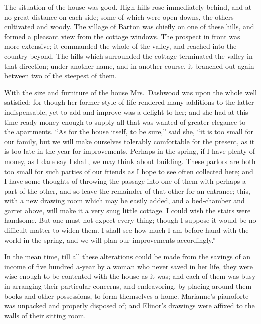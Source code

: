 \documentclass{article}
\begin{document}
The situation of the house was good.  High hills rose
immediately behind, and at no great distance on each side;
some of which were open downs, the others cultivated and woody.
The village of Barton was chiefly on one of these hills,
and formed a pleasant view from the cottage windows.
The prospect in front was more extensive; it commanded the
whole of the valley, and reached into the country beyond.
The hills which surrounded the cottage terminated
the valley in that direction; under another name,
and in another course, it branched out again between two
of the steepest of them.

With the size and furniture of the house Mrs.\ Dashwood
was upon the whole well satisfied; for though her former
style of life rendered many additions to the latter
indispensable, yet to add and improve was a delight to her;
and she had at this time ready money enough to supply all
that was wanted of greater elegance to the apartments.
``As for the house itself, to be sure,'' said she, ``it is
too small for our family, but we will make ourselves
tolerably comfortable for the present, as it is too late
in the year for improvements.  Perhaps in the spring,
if I have plenty of money, as I dare say I shall, we may
think about building.  These parlors are both too small
for such parties of our friends as I hope to see often
collected here; and I have some thoughts of throwing the
passage into one of them with perhaps a part of the other,
and so leave the remainder of that other for an entrance;
this, with a new drawing room which may be easily added,
and a bed-chamber and garret above, will make it a very snug
little cottage.  I could wish the stairs were handsome.
But one must not expect every thing; though I suppose it
would be no difficult matter to widen them.  I shall see
how much I am before-hand with the world in the spring,
and we will plan our improvements accordingly.''

In the mean time, till all these alterations could
be made from the savings of an income of five hundred
a-year by a woman who never saved in her life, they were
wise enough to be contented with the house as it was;
and each of them was busy in arranging their particular
concerns, and endeavoring, by placing around them books
and other possessions, to form themselves a home.
Marianne's pianoforte was unpacked and properly disposed of;
and Elinor's drawings were affixed to the walls of their
sitting room.
\end{document}
